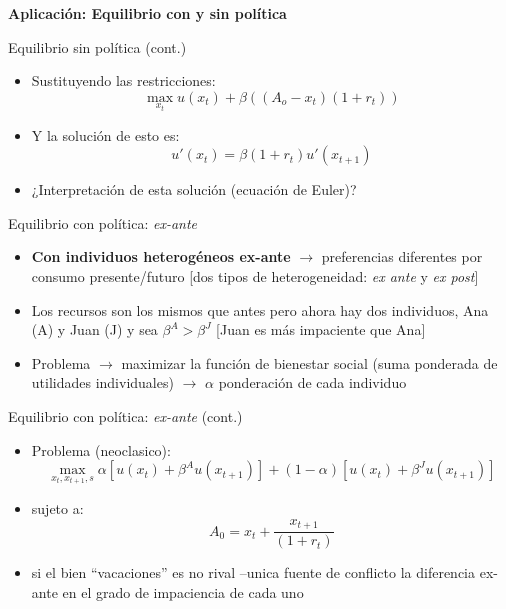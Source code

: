 \documentclass[
  ignorenonframetext,
]{beamer}
\providecommand{\tightlist}{%
  \setlength{\itemsep}{0pt}\setlength{\parskip}{0pt}}\usepackage{longtable,booktabs,array}
\begin{document}
\begin{frame}{\textbf{Aplicación: Equilibrio con y sin política}}
\begin{block}{Equilibrio sin política (cont.)}
\protect\hypertarget{equilibrio-sin-poluxedtica-cont.-1}{}
\begin{itemize}
\tightlist
\item
  Sustituyendo las restricciones:
  \[\max_{x_{t}}u(x_{t})+\beta((A_{o}-x_{t})(1+r_{t}))\]
\item
  Y la solución de esto es: \[u'(x_{t})=\beta(1+r_{t})u'(x_{t+1})\]
\item
  ¿Interpretación de esta solución (ecuación de Euler)?
\end{itemize}
\end{block}

\begin{block}{Equilibrio con política: \emph{ex-ante}}
\protect\hypertarget{equilibrio-con-poluxedtica-ex-ante}{}
\begin{itemize}
\tightlist
\item
  \textbf{Con individuos heterogéneos ex-ante} \(\longrightarrow\)
  preferencias diferentes por consumo presente/futuro {[}dos tipos de
  heterogeneidad: \emph{ex ante} y \emph{ex post}{]}
\item
  Los recursos son los mismos que antes pero ahora hay dos individuos,
  Ana (A) y Juan (J) y sea \(\beta^{A}>\beta^{J}\) {[}Juan es más
  impaciente que Ana{]}
\item
  Problema \(\longrightarrow\) maximizar la función de bienestar social
  (suma ponderada de utilidades individuales) \(\longrightarrow\)
  \(\alpha\) ponderación de cada individuo
\end{itemize}
\end{block}

\begin{block}{Equilibrio con política: \emph{ex-ante} (cont.)}
\protect\hypertarget{equilibrio-con-poluxedtica-ex-ante-cont.}{}
\begin{itemize}
\tightlist
\item
  Problema (neoclasico):
  \[\max_{x_{t},x_{t+1},s} \alpha\left[u(x_{t})+\beta^{A}u(x_{t+1})\right] + (1-\alpha)\left[u(x_{t})+\beta^{J}u(x_{t+1})\right]\]
\item
  sujeto a: \[A_{0}=x_{t}+\frac{x_{t+1}}{(1+r_{t})}\]
\item
  si el bien ``vacaciones'' es no rival --unica fuente de conflicto la
  diferencia ex-ante en el grado de impaciencia de cada uno
\end{itemize}
\end{block}


\end{frame}
\end{document}
